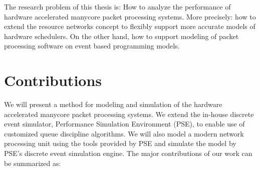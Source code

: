



The research problem of this thesis is: How to analyze the performance of hardware accelerated manycore packet processing systems. More precisely: how to extend the resource networks concept to flexibly support more accurate models of hardware schedulers. On the other hand, how to support modeling of packet processing software on event based programming models.

\section{Contributions}
We will present a method for modeling and simulation of the hardware accelerated manycore packet processing systems. We extend the in-house discrete event simulator, Performance Simulation Environment (PSE), to enable use of customized queue discipline algorithms. We will also model a modern network processing unit using the tools provided by PSE and simulate the model by PSE's discrete event simulation engine. The major contributions of our work can be summarized as:



